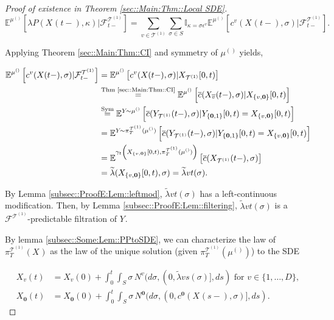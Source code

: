 \documentclass[12pt]{article}
\newcommand{\mb}{\mathbb}
\newcommand{\mc}{\mathcal}
\newcommand{\ov}{\overline}
\newcommand{\os}{\overset}
\newcommand{\te}{\text}
\newcommand{\ep}{\epsilon}
\newcommand{\ind}{\hspace{24pt}}
\newcommand{\exmu}[2]{\mb{E}^{#1}\left[#2\right]}	%
\renewcommand{\root}{\mathbf{0}}				%
\renewcommand{\v}{v}							%
\renewcommand{\S}{S}							%
\newcommand{\s}{\sigma}							%
\newcommand{\ev}{\ep}							%
\newcommand{\T}{T}								%
\renewcommand{\t}{t}							%
\newcommand{\proj}{\pi}							%
\renewcommand{\tt}{s}							%
\newcommand{\F}{\mc{F}}							%
\newcommand{\X}{X}								%
\newcommand{\IGr}{c}							%
\newcommand{\vind}[1]{^{#1}}					%
\newcommand{\vsi}[1]{^{#1}}						%
\newcommand{\cind}[1]{_{#1}}					%
\newcommand{\cl}{\ov}							%
\newcommand{\tp}[1]{(#1)}						%
\newcommand{\tip}[1]{#1}						%
\newcommand{\ts}[1]{_{#1}}						%
\newcommand{\degr}{D}							%
\newcommand{\IGrg}{\ov{c}}						%
\newcommand{\tree}{\mc{T}}						%
\newcommand{\sln}[1]{^{(#1)}}					%
\newcommand{\poiss}{N}							%
\newcommand{\rate}{\lambda}						%
\newcommand{\alt}[1]{\widetilde{#1}}			%
\newcommand{\m}{\mu}							%
\newcommand{\cm}{\gamma}						%
\newcommand{\XX}{Y}								%
\renewcommand{\mark}{\kappa}					%
\newcommand{\rp}{P}								%
\newcommand{\crate}{\alt{\lambda}}				%
\begin{document}
\begin{proof}[Proof of existence in Theorem \ref{sec::Main:Thm::Local SDE}]
\[\exmu{\m\sln{}\ts{}}{\rate{\rp{}}(\X\cind{}\tp{\t-},\mark{})|\F\vsi{\tree\sln{1}}\ts{\t-}} = \sum_{\v \in \tree\sln{1}}\sum_{\s\in \S} \mb{I}_{\mark{} = \s\ev\vind{\v}}\exmu{\m\sln{}\ts{}}{\IGr\vind{\v}(\X\cind{}\tp{\t-},\s)|\F\vsi{\tree\sln{1}}\ts{\t-}}.\]

Applying Theorem \ref{sec::Main:Thm::CI} and symmetry of \(\m\sln{}\ts{}\) yields,

\begin{align*}
\exmu{\m\sln{}\ts{}}{\IGr\vind{\v}(\X\cind{}\tp{\t-},\s)|\F\vsi{\tree\sln{1}}\ts{\t-}} &= \exmu{\m\sln{}\ts{}}{\IGr\vind{\v}(\X\cind{}\tp{\t-},\s)|\X\cind{\tree\sln{1}}\tip{[0,\t)}}\\
&\os{\te{Thm \ref{sec::Main:Thm::CI}}}{=} \exmu{\m\sln{}\ts{}}{\IGrg{}(\X\cind{\cl{\v}}\tp{\t-},\s)|\X\cind{\{\v,\root\}}\tip{[0,\t)}} \\
&\os{\te{Sym}}{=} \exmu{\XX\cind{}\tip{}\sim \m\sln{}\ts{}}{\IGrg{}(\XX\cind{\tree\sln{1}}\tp{\t-},\s)|\XX\cind{\{\root,1\}}\tip{[0,\t)} = \X\cind{\{\v,\root\}}\tip{[0,\t)}}\\
&= \exmu{\XX\cind{}\tip{}\sim \proj\vsi{\tree\sln{1}}\ts{\T}(\m\sln{}\ts{})}{\IGrg{}(\XX\cind{\tree\sln{1}}\tp{\t-},\s)|\XX\cind{\{\root,1\}}\tip{[0,\t)} = \X\cind{\{\v,\root\}}\tip{[0,\t)}}\\
&= \exmu{\cm\ts{\t}\left(\X\cind{\{\v,\root\}}\tip{[0,\t)},\proj\vsi{\tree\sln{1}}\ts{\T}(\m\sln{}\ts{})\right)}{\IGrg{}(\X\cind{\tree\sln{1}}\tp{\t-},\s)}\\
&=\crate{}{}(\X\cind{\{\v,\root\}}\tip{[0,\t)},\s) = \crate{\v}{\t}(\s).
\end{align*}

By Lemma \ref{subsec::ProofE:Lem::leftmod}, \(\crate{\v}{\t}(\s)\) has a left-continuous modification. Then, by Lemma \ref{subsec::ProofE:Lem::filtering}, \(\crate{\v}{\t}(\s)\) is a \(\F\vsi{\tree\sln{1}}\ts{}\)-predictable filtration of \(\XX\cind{}\tip{}\).

\ind By lemma \ref{subsec::Some:Lem::PPtoSDE}, we can characterize the law of \(\proj\vsi{\tree\sln{1}}\ts{\T}(\X\cind{}\tip{})\) as the law of the unique solution (given \(\proj\vsi{\tree\sln{1}}\ts{\T}(\m\sln{}\ts{})\)) to the SDE

\begin{align*}
\X\cind{\v}\tp{\t} &= \X\cind{\v}\tp{0} + \int_0^\t\int_\S \s\,\poiss\vind{\v}(d\s,(0,\crate{\v}{\tt}(\s)],d\tt) \te{ for } \v \in \{1,\dots,\degr\},\\
\X\cind{\root}\tp{\t} &= \X\cind{\root}\tp{0} + \int_0^\t\int_\S \s\,\poiss\vind{\root}(d\s,(0,\IGr\vind{\root}(\X\cind{}\tp{\tt-},\s)],d\tt).
\end{align*}
\end{proof}
\end{document}
